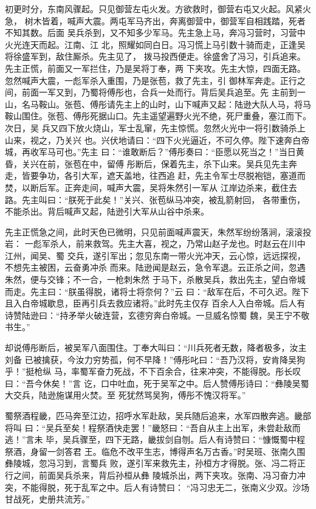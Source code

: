 初更时分，东南风骤起。只见御营左屯火发。方欲救时，御营右屯又火起。风紧火急，
树木皆着，喊声大震。两屯军马齐出，奔离御营中，御营军自相践踏，死者不知其数。后面
吴兵杀到，又不知多少军马。先主急上马，奔冯习营时，习营中火光连天而起。江南、江
北，照耀如同白日。冯习慌上马引数十骑而走，正逢吴将徐盛军到，敌住厮杀。先主见了，
拨马投西便走。徐盛舍了冯习，引兵追来。先主正慌，前面又一军拦住，乃是吴将丁奉，两
下夹攻。先主大惊，四面无路。忽然喊声大震，一彪军杀入重围，乃是张苞，救了先主，引
御林军奔走。正行之间，前面一军又到，乃蜀将傅彤也，合兵一处而行。背后吴兵追至。先
主前到一山，名马鞍山。张苞、傅彤请先主上的山时，山下喊声又起：陆逊大队人马，将马
鞍山围住。张苞、傅彤死据山口。先主遥望遍野火光不绝，死尸重叠，塞江而下。次日，吴
兵又四下放火烧山，军士乱窜，先主惊慌。忽然火光中一将引数骑杀上山来，视之，乃关兴
也。兴伏地请曰：“四下火光逼近，不可久停。陛下速奔白帝城，再收军马可也。”先主
曰：“谁敢断后？”傅彤奏曰：“臣愿以死当之！”当日黄昏，关兴在前，张苞在中，留傅
彤断后，保着先主，杀下山来。吴兵见先主奔走，皆要争功，各引大军，遮天盖地，往西追
赶，先主令军士尽脱袍铠，塞道而焚，以断后军。正奔走间，喊声大震，吴将朱然引一军从
江岸边杀来，截住去路。先主叫曰：“朕死于此矣！”关兴、张苞纵马冲突，被乱箭射回，
各带重伤，不能杀出。背后喊声又起，陆逊引大军从山谷中杀来。

先主正慌急之间，此时天色已微明，只见前面喊声震天，朱然军纷纷落涧，滚滚投岩：
一彪军杀人，前来救驾。先主大喜，视之，乃常山赵子龙也。时赵云在川中江州，闻吴、蜀
交兵，遂引军出；忽见东南一带火光冲天，云心惊，远远探视，不想先主被困，云奋勇冲杀
而来。陆逊闻是赵云，急令军退。云正杀之间，忽遇朱然，便与交锋；不一合，一枪刺朱然
于马下，杀散吴兵，救出先主，望白帝城而走。先主曰：“朕虽得脱，诸将士将奈何？”云
曰：“敌军在后，不可久迟。陛下且入白帝城歇息，臣再引兵去救应诸将。”此时先主仅存
百余人入白帝城。后人有诗赞陆逊曰：“持矛举火破连营，玄德穷奔白帝城。一旦威名惊蜀
魏，吴王宁不敬书生。”

却说傅彤断后，被吴军八面围住。丁奉大叫曰：“川兵死者无数，降者极多，汝主刘备
已被擒获，今汝力穷势孤，何不早降！”傅彤叱曰：“吾乃汉将，安肯降吴狗乎！”挺枪纵
马，率蜀军奋力死战，不下百余合，往来冲突，不能得脱。彤长叹曰：“吾今休矣！”言
讫，口中吐血，死于吴军之中。后人赞傅彤诗曰：“彝陵吴蜀大交兵，陆逊施谋用火焚。至
死犹然骂吴狗，傅彤不愧汉将军。”

蜀祭酒程畿，匹马奔至江边，招呼水军赴敌，吴兵随后追来，水军四散奔逃。畿部将叫
曰：“吴兵至矣！程祭酒快走罢！”畿怒曰：“吾自从主上出军，未尝赴敌而逃！”言未
毕，吴兵骤至，四下无路，畿拔剑自刎。后人有诗赞曰：“慷慨蜀中程祭酒，身留一剑答君
王。临危不改平生志，博得声名万古香。”时吴班、张南久围彝陵城，忽冯习到，言蜀兵
败，遂引军来救先主，孙桓方才得脱。张、冯二将正行之间，前面吴兵杀来，背后孙桓从彝
陵城杀出，两下夹攻。张南、冯习奋力冲突，不能得脱，死于乱军之中。后人有诗赞曰：
“冯习忠无二，张南义少双。沙场甘战死，史册共流芳。”

